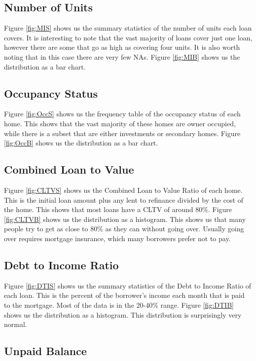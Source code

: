 \documentclass[10pt,twocolumn,letterpaper]{article}
\begin{document}
\subsection{Number of Units}

Figure \ref{fig:MIS} shows us the summary statistics of the number of units each loan covers. It is interesting to note that the vast majority of loans cover just one loan, however there are some that go as high as covering four units. It is also worth noting that in this case there are very few NAs. Figure \ref{fig:MIB} shows us the distribution as a bar chart. 

\subsection{Occupancy Status}

Figure \ref{fig:OccS} shows us the frequency table of the occupancy status of each home. This shows that the vast majority of these homes are owner occupied, while there is a subset that are either investments or secondary homes. Figure \ref{fig:OccB} shows us the distribution as a bar chart. 

\subsection{Combined Loan to Value}

Figure \ref{fig:CLTVS} shows us the Combined Loan to Value Ratio of each home. This is the initial loan amount plus any lent to refinance divided by the cost of the home. This shows that most loans have a CLTV of around 80\%. Figure \ref{fig:CLTVB} shows us the distribution as a histogram. This shows us that many people try to get as close to 80\% as they can without going over. Usually going over requires mortgage insurance, which many borrowers prefer not to pay.

\subsection{Debt to Income Ratio}

Figure \ref{fig:DTIS} shows us the summary statistics of the Debt to Income Ratio of each loan. This is the percent of the borrower's income each month that is paid to the mortgage. Most of the data is in the 20-40\% range. Figure \ref{fig:DTIB} shows us the distribution as a histogram. This distribution is surprisingly very normal.

\subsection{Unpaid Balance}
\end{document}
